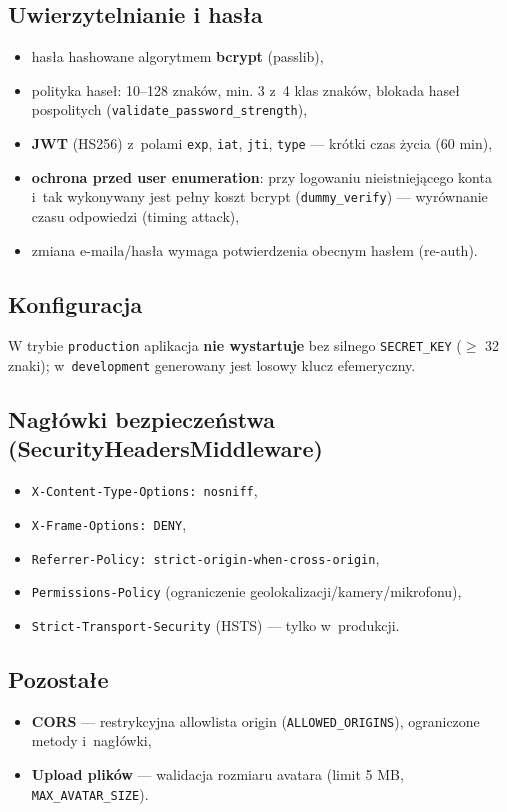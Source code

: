 \documentclass[11pt,a4paper]{article}
\begin{document}
\subsection{Uwierzytelnianie i hasła}
\begin{itemize}[noitemsep]
    \item hasła hashowane algorytmem \textbf{bcrypt} (passlib),
    \item polityka haseł: 10--128 znaków, min. 3 z~4 klas znaków, blokada haseł pospolitych
          (\texttt{validate\_password\_strength}),
    \item \textbf{JWT} (HS256) z~polami \texttt{exp}, \texttt{iat}, \texttt{jti}, \texttt{type}
          --- krótki czas życia (60 min),
    \item \textbf{ochrona przed user enumeration}: przy logowaniu nieistniejącego konta i~tak
          wykonywany jest pełny koszt bcrypt (\texttt{dummy\_verify}) --- wyrównanie czasu
          odpowiedzi (timing attack),
    \item zmiana e-maila/hasła wymaga potwierdzenia obecnym hasłem (re-auth).
\end{itemize}

\subsection{Konfiguracja}
W trybie \texttt{production} aplikacja \textbf{nie wystartuje} bez silnego \texttt{SECRET\_KEY}
($\geq$ 32 znaki); w~\texttt{development} generowany jest losowy klucz efemeryczny.

\subsection{Nagłówki bezpieczeństwa (SecurityHeadersMiddleware)}
\begin{itemize}[noitemsep]
    \item \texttt{X-Content-Type-Options: nosniff},
    \item \texttt{X-Frame-Options: DENY},
    \item \texttt{Referrer-Policy: strict-origin-when-cross-origin},
    \item \texttt{Permissions-Policy} (ograniczenie geolokalizacji/kamery/mikrofonu),
    \item \texttt{Strict-Transport-Security} (HSTS) --- tylko w~produkcji.
\end{itemize}

\subsection{Pozostałe}
\begin{itemize}[noitemsep]
    \item \textbf{CORS} --- restrykcyjna allowlista origin (\texttt{ALLOWED\_ORIGINS}),
          ograniczone metody i~nagłówki,
    \item \textbf{Upload plików} --- walidacja rozmiaru avatara (limit 5 MB,
          \texttt{MAX\_AVATAR\_SIZE}).
\end{itemize}
\end{document}
